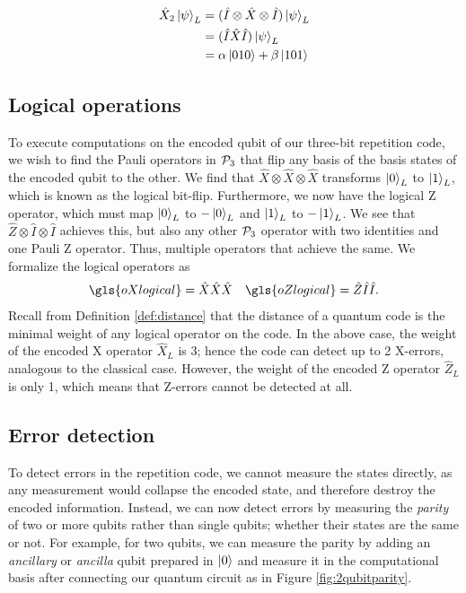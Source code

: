 \begin{align}
  \nonumber \hat{X}_2\ket{\psi}_L 
  \nonumber&= (\hat{I}\otimes \hat{X} \otimes \hat{I}) \ket{\psi}_L \\
  \nonumber&= (\hat{I} \hat{X} \hat{I}) \ket{\psi}_L\\
  &= \alpha\ket{010} + \beta\ket{101} \label{eq:qec_3bitflip}
\end{align}

\subsection{Logical operations}
To execute computations on the encoded qubit of our three-bit repetition code, we wish to find the Pauli operators in $\mathcal{P}_3$ that flip any basis of the basis states of the encoded qubit to the other. We find that $\hat{X}\otimes \hat{X}\otimes \hat{X}$ transforms $\ket{0}_L$ to $\ket{1}_L$, which is known as the logical bit-flip. Furthermore, we now have the logical Z operator, which must map $\ket{0}_L$ to $-\ket{0}_L$ and $\ket{1}_L$ to $-\ket{1}_L$. We see that $\hat{Z}\otimes \hat{I}\otimes \hat{I}$ achieves this, but also any other $\mathcal{P}_3$ operator with two identities and one Pauli Z operator. Thus, multiple operators that achieve the same. We formalize the logical operators as
\begin{align}\label{eq:qec_3bitlogical}
  \gls{oXlogical} = \hat{X}\hat{X}\hat{X} && \gls{oZlogical} = \hat{Z}\hat{I}\hat{I}.
\end{align}
Recall from Definition \ref{def:distance} that the distance of a quantum code is the minimal weight of any logical operator on the code. In the above case, the weight of the encoded X operator $\hat{X}_L$ is 3; hence the code can detect up to 2 X-errors, analogous to the classical case. However, the weight of the encoded Z operator $\hat{Z}_L$ is only 1, which means that Z-errors cannot be detected at all.

\subsection{Error detection}
To detect errors in the repetition code, we cannot measure the states directly, as any measurement would collapse the encoded state, and therefore destroy the encoded information. Instead, we can now detect errors by measuring the \emph{parity} of two or more qubits rather than single qubits; whether their states are the same or not. For example, for two qubits, we can measure the parity by adding an \emph{ancillary} or \emph{ancilla} qubit prepared in $\ket{0}$ and measure it in the computational basis after connecting our quantum circuit as in Figure \ref{fig:2qubitparity}. 

